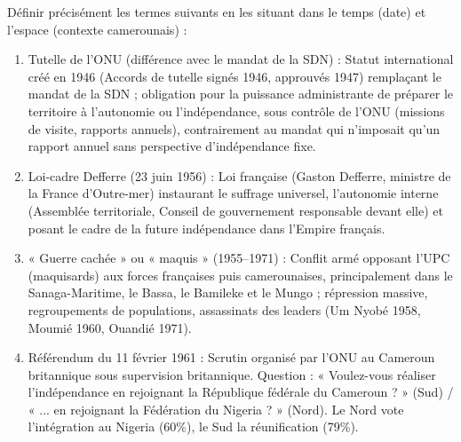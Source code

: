 \documentclass[11pt]{article}
\newcommand{\cle}[1]{{\popxbold\color{popdark}#1}}
\begin{document}
\begin{exercice}
Définir précisément les termes suivants en les situant dans le temps (date) et l'espace (contexte camerounais) :
\begin{enumerate}
\item \cle{Tutelle de l'ONU} (différence avec le mandat de la SDN) : Statut international créé en 1946 (Accords de tutelle signés 1946, approuvés 1947) remplaçant le mandat de la SDN ; obligation pour la puissance administrante de préparer le territoire à l'autonomie ou l'indépendance, sous contrôle de l'ONU (missions de visite, rapports annuels), contrairement au mandat qui n'imposait qu'un rapport annuel sans perspective d'indépendance fixe.
\item \cle{Loi-cadre Defferre} (23 juin 1956) : Loi française (Gaston Defferre, ministre de la France d'Outre-mer) instaurant le suffrage universel, l'autonomie interne (Assemblée territoriale, Conseil de gouvernement responsable devant elle) et posant le cadre de la future indépendance dans l'Empire français.
\item \cle{« Guerre cachée » ou « maquis »} (1955--1971) : Conflit armé opposant l'UPC (maquisards) aux forces françaises puis camerounaises, principalement dans le Sanaga-Maritime, le Bassa, le Bamileke et le Mungo ; répression massive, regroupements de populations, assassinats des leaders (Um Nyobé 1958, Moumié 1960, Ouandié 1971).
\item \cle{Référendum du 11 février 1961} : Scrutin organisé par l'ONU au Cameroun britannique sous supervision britannique. Question : « Voulez-vous réaliser l'indépendance en rejoignant la République fédérale du Cameroun ? » (Sud) / « ... en rejoignant la Fédération du Nigeria ? » (Nord). Le Nord vote l'intégration au Nigeria (60\%), le Sud la réunification (79\%).
\end{enumerate}
\end{exercice}
\end{document}
